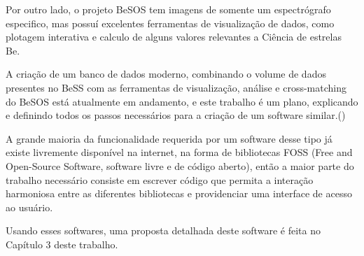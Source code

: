 Por outro lado, o projeto BeSOS tem imagens de somente um espectrógrafo especifico, mas possuí excelentes ferramentas de visualização de dados, como plotagem interativa e calculo de alguns valores relevantes a Ciência de estrelas Be.

A criação de um banco de dados moderno, combinando o volume de dados presentes no BeSS com as ferramentas de visualização, análise e cross-matching do BeSOS está atualmente em andamento, e este trabalho é um plano, explicando e definindo todos os passos necessários para a criação de um software similar.(\citealt{besos_database})

A grande maioria da funcionalidade requerida por um software desse tipo já existe livremente disponível na internet, na forma de bibliotecas FOSS (Free and Open-Source Software, software livre e de código aberto), então a maior parte do trabalho necessário consiste em escrever código que permita a interação harmoniosa entre as diferentes bibliotecas e providenciar uma interface de acesso ao usuário.

Usando esses softwares, uma proposta detalhada deste software é feita no Capítulo 3 deste trabalho.
